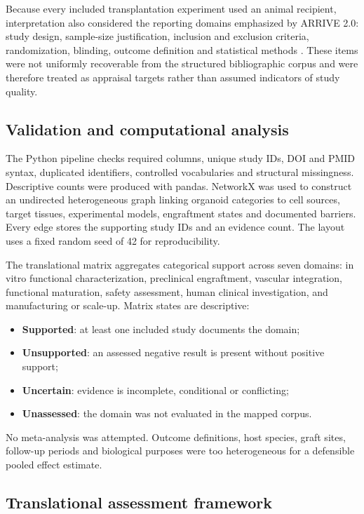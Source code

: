 \documentclass[11pt,a4paper]{article}
\begin{document}
Because every included transplantation experiment used an animal recipient, interpretation also considered the reporting domains emphasized by ARRIVE 2.0: study design, sample-size justification, inclusion and exclusion criteria, randomization, blinding, outcome definition and statistical methods \citep{perciedusert2020}. These items were not uniformly recoverable from the structured bibliographic corpus and were therefore treated as appraisal targets rather than assumed indicators of study quality.

\subsection{Validation and computational analysis}

The Python pipeline checks required columns, unique study IDs, DOI and PMID syntax, duplicated identifiers, controlled vocabularies and structural missingness. Descriptive counts were produced with pandas. NetworkX was used to construct an undirected heterogeneous graph linking organoid categories to cell sources, target tissues, experimental models, engraftment states and documented barriers. Every edge stores the supporting study IDs and an evidence count. The layout uses a fixed random seed of 42 for reproducibility.

The translational matrix aggregates categorical support across seven domains: in vitro functional characterization, preclinical engraftment, vascular integration, functional maturation, safety assessment, human clinical investigation, and manufacturing or scale-up. Matrix states are descriptive:

\begin{itemize}
  \item \textbf{Supported}: at least one included study documents the domain;
  \item \textbf{Unsupported}: an assessed negative result is present without positive support;
  \item \textbf{Uncertain}: evidence is incomplete, conditional or conflicting;
  \item \textbf{Unassessed}: the domain was not evaluated in the mapped corpus.
\end{itemize}

No meta-analysis was attempted. Outcome definitions, host species, graft sites, follow-up periods and biological purposes were too heterogeneous for a defensible pooled effect estimate.

\subsection{Translational assessment framework}
\end{document}
